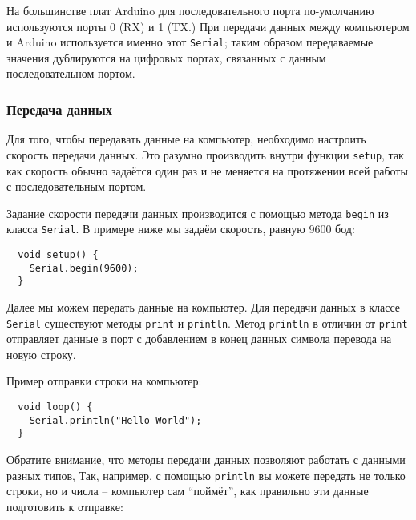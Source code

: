 \documentclass[../sparc.tex]{subfiles}
\begin{document}
На большинстве плат Arduino для последовательного порта по-умолчанию
используются порты 0 (RX) и 1 (TX.)  При передачи данных между компьютером и
Arduino используется именно этот \texttt{Serial}; таким образом передаваемые
значения дублируются на цифровых портах, связанных с данным последовательном
портом.



\subsubsection{Передача данных}

Для того, чтобы передавать данные на компьютер, необходимо настроить скорость
передачи данных.  Это разумно производить внутри функции \texttt{setup}, так как
скорость обычно задаётся один раз и не меняется на протяжении всей работы с
последовательным портом.

Задание скорости передачи данных производится с помощью метода \texttt{begin} из
класса \texttt{Serial}.  В примере ниже мы задаём скорость, равную 9600 бод:

\begin{verbatim}
  void setup() {
    Serial.begin(9600);
  }
\end{verbatim}

Далее мы можем передать данные на компьютер.  Для передачи данных в классе
\texttt{Serial} существуют методы \texttt{print} и \texttt{println}.  Метод
\texttt{println} в отличии от \texttt{print} отправляет данные в порт с
добавлением в конец данных символа перевода на новую строку.


Пример отправки строки на компьютер:

\begin{verbatim}
  void loop() {
    Serial.println("Hello World");
  }
\end{verbatim}

Обратите внимание, что методы передачи данных позволяют работать с данными
разных типов, Так, например, с помощью \texttt{println} вы можете передать не
только строки, но и числа -- компьютер сам ``поймёт'', как правильно эти данные
подготовить к отправке:
\end{document}
